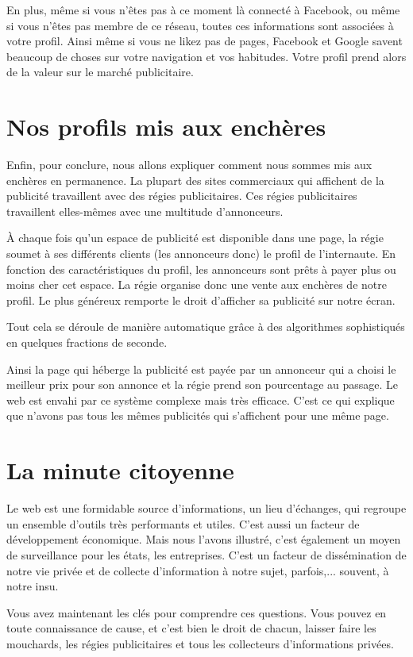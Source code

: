\documentclass[12pt]{article}
\begin{document}
En plus, même si  vous n'êtes pas à ce moment là connecté à Facebook,
ou même si vous n'êtes pas membre de ce réseau, toutes ces
informations sont associées à votre profil. Ainsi même si vous ne
\og likez\fg{} pas de pages, Facebook et Google savent beaucoup de choses sur
votre navigation et vos habitudes. Votre profil prend alors de la
valeur sur le marché publicitaire.

\section*{Nos profils mis aux enchères}
Enfin, pour conclure, nous allons expliquer comment nous sommes mis
aux enchères en permanence. La plupart des sites commerciaux qui
affichent de la publicité travaillent avec des régies
publicitaires. Ces régies publicitaires travaillent elles-mêmes avec
une multitude d'annonceurs.

À chaque fois qu'un espace de publicité est disponible dans une page, la
régie soumet à ses  différents clients (les annonceurs donc) le profil
de l'internaute. En fonction des caractéristiques du profil, les
annonceurs sont prêts à payer plus ou moins cher cet espace. La
régie organise donc une vente aux enchères de notre profil. Le plus
généreux remporte le droit d'afficher sa publicité sur notre écran. 

Tout cela se déroule de manière automatique grâce à des algorithmes
sophistiqués en quelques fractions de seconde.

Ainsi la page qui héberge la publicité est payée par un annonceur qui
a choisi le meilleur prix pour son annonce et la régie prend son
pourcentage au passage. Le web est envahi par ce système complexe mais
très efficace. C'est ce qui explique que n'avons pas tous les mêmes
publicités qui s'affichent pour une même page.

\section*{La minute citoyenne}
Le web est une formidable source d'informations, un lieu d'échanges,
qui regroupe un ensemble d'outils très performants et utiles. C'est
aussi un facteur de développement économique. Mais nous l'avons
illustré, c'est également un moyen de surveillance pour les états, les
entreprises. C'est un facteur de dissémination de notre vie privée et
de collecte d'information à notre sujet, parfois,... souvent, à notre
insu. 

Vous avez maintenant les clés pour comprendre ces questions. Vous
pouvez en toute connaissance de cause, et c'est bien le droit de
chacun, laisser faire les mouchards, les régies publicitaires et tous
les collecteurs d'informations privées.
\end{document}
